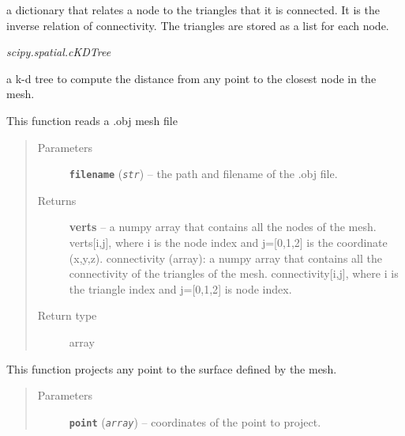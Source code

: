 \documentclass[letterpaper,10pt,english]{sphinxmanual}
\begin{document}
\begin{fulllineitems}
\begin{fulllineitems}
a dictionary that relates a node to the triangles that it is connected. It is the inverse relation of connectivity. The triangles are stored as a list for each node.

\end{fulllineitems}


\begin{fulllineitems}
\label{mesh:mesh.Mesh.tree}
\emph{scipy.spatial.cKDTree}

a k-d tree to compute the distance from any point to the closest node in the mesh.

\end{fulllineitems}


\begin{fulllineitems}
\label{mesh:mesh.Mesh.loadOBJ}
This function reads a .obj mesh file
\begin{quote}\begin{description}
\item[{Parameters}] \leavevmode
\textbf{\texttt{filename}} (\emph{\texttt{str}}) -- the path and filename of the .obj file.

\item[{Returns}] \leavevmode
\textbf{verts} --
a numpy array that contains all the nodes of the mesh. verts{[}i,j{]}, where i is the node index and j={[}0,1,2{]} is the coordinate (x,y,z).
connectivity (array): a numpy array that contains all the connectivity of the triangles of the mesh. connectivity{[}i,j{]}, where i is the triangle index and j={[}0,1,2{]} is node index.

\item[{Return type}] \leavevmode
array

\end{description}\end{quote}

\end{fulllineitems}


\begin{fulllineitems}
\label{mesh:mesh.Mesh.project_new_point}
This function projects any point to the surface defined by the mesh.
\begin{quote}\begin{description}
\item[{Parameters}] \leavevmode
\textbf{\texttt{point}} (\emph{\texttt{array}}) -- coordinates of the point to project.


\end{description}
\end{quote}
\end{fulllineitems}
\end{fulllineitems}
\end{document}
